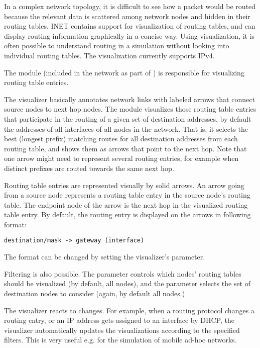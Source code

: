 In a complex network topology, it is difficult to see how a packet would be
routed because the relevant data is scattered among network nodes and hidden in
their routing tables. INET contains support for visualization of routing tables,
and can display routing information graphically in a concise way. Using
visualization, it is often possible to understand routing in a simulation
without looking into individual routing tables. The visualization currently
supports IPv4.

The  module (included in the network as part of
) is responsible for visualizing routing table entries.

The visualizer basically annotates network links with labeled arrows that
connect source nodes to next hop nodes. The module visualizes those routing
table entries that participate in the routing of a given set of destination
addresses, by default the addresses of all interfaces of all nodes in the
network. That is, it selects the best (longest prefix) matching routes for all
destination addresses from each routing table, and shows them as arrows that
point to the next hop. Note that one arrow might need to represent several
routing entries, for example when distinct prefixes are routed towards the same
next hop.

Routing table entries are represented visually by solid arrows. An arrow going
from a source node represents a routing table entry in the source node's routing
table. The endpoint node of the arrow is the next hop in the visualized routing
table entry. By default, the routing entry is displayed on the arrows in
following format:

\begin{verbatim}
destination/mask -> gateway (interface)
\end{verbatim}

The format can be changed by setting the visualizer's  parameter.

Filtering is also possible. The  parameter controls which nodes'
routing tables should be visualized (by default, all nodes), and the
 parameter selects the set of destination nodes to consider
(again, by default all nodes.)

The visualizer reacts to changes. For example, when a routing protocol changes a
routing entry, or an IP address gets assigned to an interface by DHCP, the
visualizer automatically updates the visualizations according to the specified
filters. This is very useful e.g. for the simulation of mobile ad-hoc networks.


